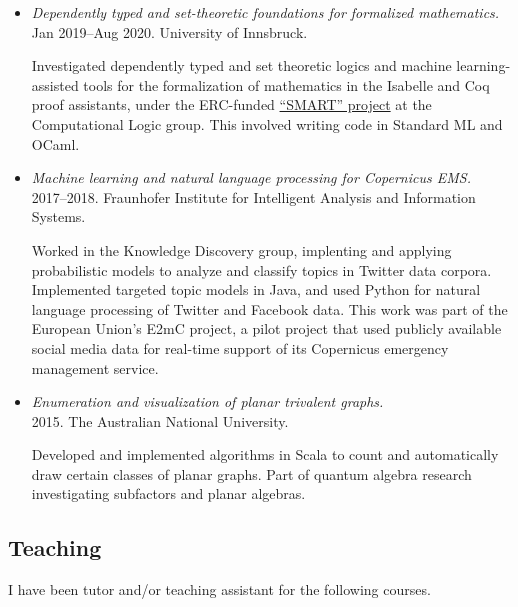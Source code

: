 \documentclass[12pt,a4paper]{article}
\begin{document}
\begin{itemize}
\item
  \emph{Dependently typed and set-theoretic foundations for formalized mathematics.}\\
  Jan 2019--Aug 2020.
  University of Innsbruck.

  Investigated dependently typed and set theoretic logics and machine learning-assisted tools for the formalization of mathematics in the Isabelle and Coq proof assistants, under the ERC-funded \href{https://project-smart.uibk.ac.at}{``SMART'' project} at the Computational Logic group.
  This involved writing code in Standard ML and OCaml.

\item
  \emph{Machine learning and natural language processing for Copernicus EMS.}\\
  2017--2018.
  Fraunhofer Institute for Intelligent Analysis and Information Systems.

  Worked in the Knowledge Discovery group, implenting and applying probabilistic models to analyze and classify topics in Twitter data corpora.
  Implemented targeted topic models in Java, and used Python for natural language processing of Twitter and Facebook data.
  This work was part of the European Union's E2mC project, a pilot project that used publicly available social media data for real-time support of its Copernicus emergency management service.

\item
  \emph{Enumeration and visualization of planar trivalent graphs.}\\
  2015.
  The Australian National University.

  Developed and implemented algorithms in Scala to count and automatically draw certain classes of planar graphs.
  Part of quantum algebra research investigating subfactors and planar algebras.
\end{itemize}

\subsection{Teaching}

I have been tutor and/or teaching assistant for the following courses.
\end{document}
